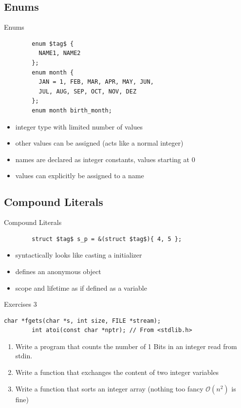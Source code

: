 \documentclass[english,compress]{beamer}
\begin{document}
\subsection{Enums}
\begin{frame}[fragile]{Enums}
	\begin{lstlisting}
		enum $tag$ {
		  NAME1, NAME2
		};
		enum month {
		  JAN = 1, FEB, MAR, APR, MAY, JUN,
		  JUL, AUG, SEP, OCT, NOV, DEZ
		};
		enum month birth_month;
	\end{lstlisting}
	\begin{itemize}
		\item integer type with limited number of values
		\item other values can be assigned (acts like a normal integer)
		\item names are declared as integer constants, values
			starting at 0
		\item values can explicitly be assigned to a name
	\end{itemize}
\end{frame}

\subsection{Compound Literals}
\begin{frame}[fragile]{Compound Literals}
	\begin{lstlisting}
		struct $tag$ s_p = &(struct $tag$){ 4, 5 };
	\end{lstlisting}
	\begin{itemize}
		\item syntactically looks like casting a initializer
		\item defines an anonymous object
		\item scope and lifetime as if defined as a variable
	\end{itemize}
\end{frame}


\begin{frame}[fragile]{Exercises 3}
	\begin{lstlisting}[numbers=none]
		char *fgets(char *s, int size, FILE *stream);
		int atoi(const char *nptr); // From <stdlib.h>
	\end{lstlisting}
	\begin{enumerate}
		\item Write a program that counts the number of 1 Bits in an integer read from stdin.
		\item Write a function that exchanges the content of two integer variables
		\item Write a function that sorts an integer array (nothing too fancy $\mathcal O(n^2)$ is fine)
	\end{enumerate}
\end{frame}
\end{document}
